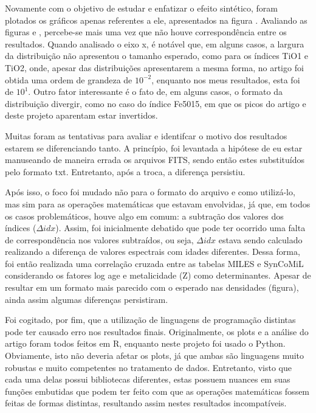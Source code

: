 \documentclass[12pt]{projeto}
\begin{document}
Novamente com o objetivo de estudar e enfatizar o efeito sintético, foram plotados os gráficos apenas referentes a ele, apresentados na figura .
Avaliando as figuras e , percebe-se mais uma vez que não houve correspondência entre os resultados. Quando analisado o eixo x, é notável que, em alguns casos, a largura da distribuição não apresentou o tamanho esperado, como para os índices TiO1 e TiO2, onde, apesar das distribuições apresentarem a mesma forma, no artigo foi obtida uma ordem de grandeza de \(10^{-2}\), enquanto nos meus resultados, esta foi de \(10^1\). Outro fator interessante é o fato de, em alguns casos, o formato da distribuição divergir, como no caso do índice Fe5015, em que os picos do artigo e deste projeto aparentam estar invertidos. 

Muitas foram as tentativas para avaliar e identifcar o motivo dos resultados estarem se diferenciando tanto. A princípio, foi levantada a hipótese de eu estar manuseando de maneira errada os arquivos FITS, sendo então estes substituídos pelo formato txt. Entretanto, após a troca, a diferença persistiu.

Após isso, o foco foi mudado não para o formato do arquivo e como utilizá-lo, mas sim para as operações matemáticas que estavam envolvidas, já que, em todos os casos problemáticos, houve algo em comum: a subtração dos valores dos índices (\(\Delta idx\)). Assim, foi inicialmente debatido que pode ter ocorrido uma falta de correspondência nos valores subtraídos, ou seja, \(\Delta idx\) estava sendo calculado realizando a diferença de valores espectrais com idades diferentes. Dessa forma, foi então realizada uma correlação cruzada entre as tabelas MILES e SynCoMiL considerando os fatores log age e metalicidade (Z) como determinantes. Apesar de resultar em um formato mais parecido com o esperado nas densidades (figura), ainda assim algumas diferenças persistiram.

Foi cogitado, por fim, que a utilização de linguagens de programação distintas pode ter causado erro nos resultados finais. Originalmente, os plots e a análise do artigo foram todos feitos em R, enquanto neste projeto foi usado o Python. Obviamente, isto não deveria afetar os plots, já que ambas são linguagens muito robustas e muito competentes no tratamento de dados. Entretanto, visto que cada uma delas possui bibliotecas diferentes, estas possuem nuances em suas funções embutidas que podem ter feito com que as operações matemáticas fossem feitas de formas distintas, resultando assim nestes resultados incompatíveis.
\end{document}
